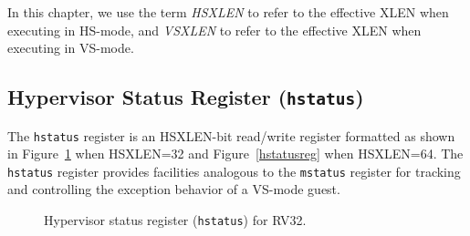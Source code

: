 In this chapter, we use the term {\em HSXLEN} to refer to the effective XLEN
when executing in HS-mode, and {\em VSXLEN} to refer to the effective
XLEN when executing in VS-mode.

\subsection{Hypervisor Status Register ({\tt hstatus})}

The {\tt hstatus} register is an HSXLEN-bit read/write register
formatted as shown in Figure~\ref{hstatusreg-rv32} when HSXLEN=32 and
Figure~\ref{hstatusreg} when HSXLEN=64.
The {\tt hstatus}
register provides facilities analogous to the {\tt mstatus} register
for tracking and controlling the exception behavior of a VS-mode guest.

\begin{figure}[h!]
{\footnotesize
\begin{center}
\setlength{\tabcolsep}{4pt}
\end{center}
}
\vspace{-0.1in}
\caption{Hypervisor status register ({\tt hstatus}) for RV32.}
\label{hstatusreg-rv32}
\end{figure}

